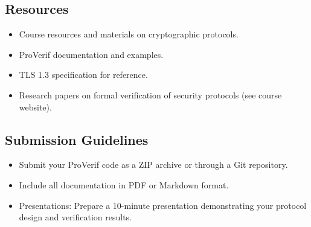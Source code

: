 \documentclass[10pt,a4paper,american]{exam}
\begin{document}
\subsection*{Resources}
\begin{itemize}
	\item Course resources and materials on cryptographic protocols.
	\item ProVerif documentation and examples.
	\item TLS 1.3 specification for reference.
	\item Research papers on formal verification of security protocols (see course website).
\end{itemize}

\subsection*{Submission Guidelines}
\begin{itemize}
	\item Submit your ProVerif code as a ZIP archive or through a Git repository.
	\item Include all documentation in PDF or Markdown format.
	\item Presentations: Prepare a 10-minute presentation demonstrating your protocol design and verification results.
\end{itemize}
\end{document}

